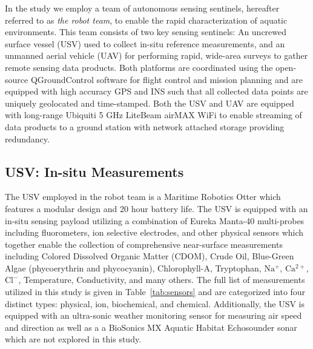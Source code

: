 \documentclass[journal,article,submit,pdftex,moreauthors]{Definitions/mdpi}
\begin{document}
In the study we employ a team of autonomous sensing sentinels, hereafter referred to as \textit{the robot team}, to enable the rapid characterization of aquatic environments. This team consists of two key sensing sentinels: An uncrewed surface vessel (USV) used to collect in-situ reference measurements, and an unmanned aerial vehicle (UAV) for performing rapid, wide-area surveys to gather remote sensing data products. Both platforms are coordinated using the open-source QGroundControl software for flight control and mission planning \cite{qgroundcontrol} and are equipped with high accuracy GPS and INS such that all collected data points are uniquely geolocated and time-stamped. Both the USV and UAV are equipped with long-range Ubiquiti 5 GHz LiteBeam airMAX WiFi to enable streaming of data products to a ground station with network attached storage providing redundancy.

\subsection{USV: In-situ Measurements}

The USV employed in the robot team is a Maritime Robotics Otter which features a modular design and 20 hour battery life. The USV is equipped with an in-situ sensing payload utilizing a combination of Eureka Manta-40 multi-probes including fluorometers, ion selective electrodes, and other physical sensors which together enable the collection of comprehensive near-surface measurements including Colored Dissolved Organic Matter (CDOM), Crude Oil, Blue-Green Algae (phycoerythrin and phycocyanin), Chlorophyll-A, Tryptophan, $\mathrm{Na^+}$, $\mathrm{Ca^{2+}}$, $\mathrm{Cl^-}$, Temperature, Conductivity, and many others. The full list of measurements utilized in this study is given in Table~\ref{tab:sensors} and are categorized into four distinct types: physical, ion, biochemical, and chemical. Additionally, the USV is equipped with an ultra-sonic weather monitoring sensor for measuring air speed and direction as well as a a BioSonics MX Aquatic Habitat Echosounder sonar which are not explored in this study.

\end{document}
